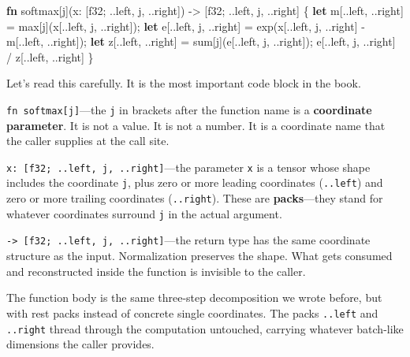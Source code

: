 \documentclass[11pt,]{article}
\newenvironment{Shaded}{}{}
\newcommand{\DataTypeTok}[1]{\textcolor[rgb]{0.56,0.13,0.00}{#1}}
\newcommand{\KeywordTok}[1]{\textcolor[rgb]{0.00,0.44,0.13}{\textbf{#1}}}
\newcommand{\NormalTok}[1]{#1}
\newcommand{\OperatorTok}[1]{\textcolor[rgb]{0.40,0.40,0.40}{#1}}
\begin{document}
\begin{Shaded}
\begin{Highlighting}[]
\KeywordTok{fn}\NormalTok{ softmax[j](x: }\OperatorTok{[}\DataTypeTok{f32}\NormalTok{; ..left, j, ..right}\OperatorTok{]}\NormalTok{)}
\NormalTok{    -> }\OperatorTok{[}\DataTypeTok{f32}\NormalTok{; ..left, j, ..right}\OperatorTok{]}
\OperatorTok{\{}
    \KeywordTok{let}\NormalTok{ m}\OperatorTok{[}\NormalTok{..left, ..right}\OperatorTok{]}\NormalTok{ = max}\OperatorTok{[}\NormalTok{j}\OperatorTok{]}\NormalTok{(x}\OperatorTok{[}\NormalTok{..left, j, ..right}\OperatorTok{]}\NormalTok{);}
    \KeywordTok{let}\NormalTok{ e}\OperatorTok{[}\NormalTok{..left, j, ..right}\OperatorTok{]}\NormalTok{ = exp(x}\OperatorTok{[}\NormalTok{..left, j, ..right}\OperatorTok{]}\NormalTok{ - m}\OperatorTok{[}\NormalTok{..left, ..right}\OperatorTok{]}\NormalTok{);}
    \KeywordTok{let}\NormalTok{ z}\OperatorTok{[}\NormalTok{..left, ..right}\OperatorTok{]}\NormalTok{ = sum}\OperatorTok{[}\NormalTok{j}\OperatorTok{]}\NormalTok{(e}\OperatorTok{[}\NormalTok{..left, j, ..right}\OperatorTok{]}\NormalTok{);}
\NormalTok{    e}\OperatorTok{[}\NormalTok{..left, j, ..right}\OperatorTok{]}\NormalTok{ / z}\OperatorTok{[}\NormalTok{..left, ..right}\OperatorTok{]}
\OperatorTok{\}}
\end{Highlighting}
\end{Shaded}

Let's read this carefully. It is the most important code block in the
book.

\texttt{fn\ softmax{[}j{]}}---the \texttt{j} in brackets after the
function name is a \textbf{coordinate parameter}. It is not a value. It
is not a number. It is a coordinate name that the caller supplies at the
call site.

\texttt{x:\ {[}f32;\ ..left,\ j,\ ..right{]}}---the parameter \texttt{x}
is a tensor whose shape includes the coordinate \texttt{j}, plus zero or
more leading coordinates (\texttt{..left}) and zero or more trailing
coordinates (\texttt{..right}). These are \textbf{packs}---they stand
for whatever coordinates surround \texttt{j} in the actual argument.

\texttt{-\textgreater{}\ {[}f32;\ ..left,\ j,\ ..right{]}}---the return
type has the same coordinate structure as the input. Normalization
preserves the shape. What gets consumed and reconstructed inside the
function is invisible to the caller.

The function body is the same three-step decomposition we wrote before,
but with rest packs instead of concrete single coordinates. The packs
\texttt{..left} and \texttt{..right} thread through the computation
untouched, carrying whatever batch-like dimensions the caller provides.
\end{document}
